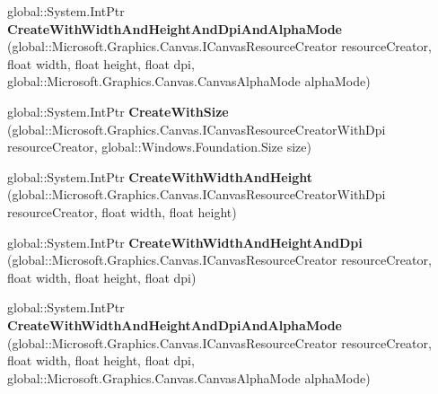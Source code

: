 \begin{DoxyCompactItemize}
global\+::\+System.\+Int\+Ptr {\bfseries Create\+With\+Width\+And\+Height\+And\+Dpi\+And\+Alpha\+Mode} (global\+::\+Microsoft.\+Graphics.\+Canvas.\+I\+Canvas\+Resource\+Creator resource\+Creator, float width, float height, float dpi, global\+::\+Microsoft.\+Graphics.\+Canvas.\+Canvas\+Alpha\+Mode alpha\+Mode)
\item 
\mbox{\label{interface_microsoft_1_1_graphics_1_1_canvas_1_1_u_i_1_1_xaml_1_1_i_canvas_image_source_factory_a4baedcf33415e7e6999fbfaef3bbfbcf}} 
global\+::\+System.\+Int\+Ptr {\bfseries Create\+With\+Size} (global\+::\+Microsoft.\+Graphics.\+Canvas.\+I\+Canvas\+Resource\+Creator\+With\+Dpi resource\+Creator, global\+::\+Windows.\+Foundation.\+Size size)
\item 
\mbox{\label{interface_microsoft_1_1_graphics_1_1_canvas_1_1_u_i_1_1_xaml_1_1_i_canvas_image_source_factory_a10963349bb9cd2efbf8a9fd0e452503b}} 
global\+::\+System.\+Int\+Ptr {\bfseries Create\+With\+Width\+And\+Height} (global\+::\+Microsoft.\+Graphics.\+Canvas.\+I\+Canvas\+Resource\+Creator\+With\+Dpi resource\+Creator, float width, float height)
\item 
\mbox{\label{interface_microsoft_1_1_graphics_1_1_canvas_1_1_u_i_1_1_xaml_1_1_i_canvas_image_source_factory_a6cfd3bc04a35df5bd6c867d8ded122c0}} 
global\+::\+System.\+Int\+Ptr {\bfseries Create\+With\+Width\+And\+Height\+And\+Dpi} (global\+::\+Microsoft.\+Graphics.\+Canvas.\+I\+Canvas\+Resource\+Creator resource\+Creator, float width, float height, float dpi)
\item 
\mbox{\label{interface_microsoft_1_1_graphics_1_1_canvas_1_1_u_i_1_1_xaml_1_1_i_canvas_image_source_factory_a7f81e40660e111a979eb5fc6d370cce8}} 
global\+::\+System.\+Int\+Ptr {\bfseries Create\+With\+Width\+And\+Height\+And\+Dpi\+And\+Alpha\+Mode} (global\+::\+Microsoft.\+Graphics.\+Canvas.\+I\+Canvas\+Resource\+Creator resource\+Creator, float width, float height, float dpi, global\+::\+Microsoft.\+Graphics.\+Canvas.\+Canvas\+Alpha\+Mode alpha\+Mode)
\item 

\end{DoxyCompactItemize}

